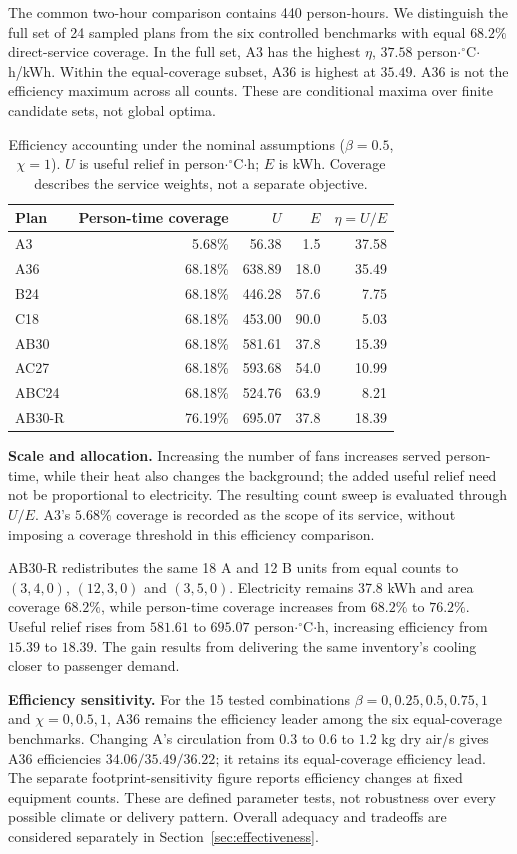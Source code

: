 The common two-hour comparison contains 440 person-hours. We distinguish the full set of 24 sampled plans from the six controlled benchmarks with equal $68.2\%$ direct-service coverage. In the full set, A3 has the highest $\eta$, $37.58$ person$\cdot{}^{\circ}$C$\cdot$h/kWh. Within the equal-coverage subset, A36 is highest at $35.49$. A36 is not the efficiency maximum across all counts. These are conditional maxima over finite candidate sets, not global optima.

\begin{table}[!ht]
\centering\small
\caption{Efficiency accounting under the nominal assumptions ($\beta=0.5$, $\chi=1$). $U$ is useful relief in person$\cdot{}^{\circ}$C$\cdot$h; $E$ is kWh. Coverage describes the service weights, not a separate objective.}
\label{tab:deployment-results}
\begin{tabular}{@{}lrrrr@{}}
\toprule
Plan & Person-time coverage & $U$ & $E$ & $\eta=U/E$\\
\midrule
A3 & 5.68\% & 56.38 & 1.5 & 37.58\\
A36 & 68.18\% & 638.89 & 18.0 & 35.49\\
B24 & 68.18\% & 446.28 & 57.6 & 7.75\\
C18 & 68.18\% & 453.00 & 90.0 & 5.03\\
AB30 & 68.18\% & 581.61 & 37.8 & 15.39\\
AC27 & 68.18\% & 593.68 & 54.0 & 10.99\\
ABC24 & 68.18\% & 524.76 & 63.9 & 8.21\\
AB30-R & 76.19\% & 695.07 & 37.8 & 18.39\\
\bottomrule
\end{tabular}
\end{table}

\noindent\textbf{Scale and allocation.} Increasing the number of fans increases served person-time, while their heat also changes the background; the added useful relief need not be proportional to electricity. The resulting count sweep is evaluated through $U/E$. A3's $5.68\%$ coverage is recorded as the scope of its service, without imposing a coverage threshold in this efficiency comparison.

AB30-R redistributes the same 18 A and 12 B units from equal counts to $(3,4,0)$, $(12,3,0)$ and $(3,5,0)$. Electricity remains 37.8 kWh and area coverage $68.2\%$, while person-time coverage increases from $68.2\%$ to $76.2\%$. Useful relief rises from $581.61$ to $695.07$ person$\cdot{}^{\circ}$C$\cdot$h, increasing efficiency from $15.39$ to $18.39$. The gain results from delivering the same inventory's cooling closer to passenger demand.

\noindent\textbf{Efficiency sensitivity.} For the 15 tested combinations $\beta=0,0.25,0.5,0.75,1$ and $\chi=0,0.5,1$, A36 remains the efficiency leader among the six equal-coverage benchmarks. Changing A's circulation from $0.3$ to $0.6$ to $1.2$ kg dry air/s gives A36 efficiencies $34.06/35.49/36.22$; it retains its equal-coverage efficiency lead. The separate footprint-sensitivity figure reports efficiency changes at fixed equipment counts. These are defined parameter tests, not robustness over every possible climate or delivery pattern. Overall adequacy and tradeoffs are considered separately in Section~\ref{sec:effectiveness}.
